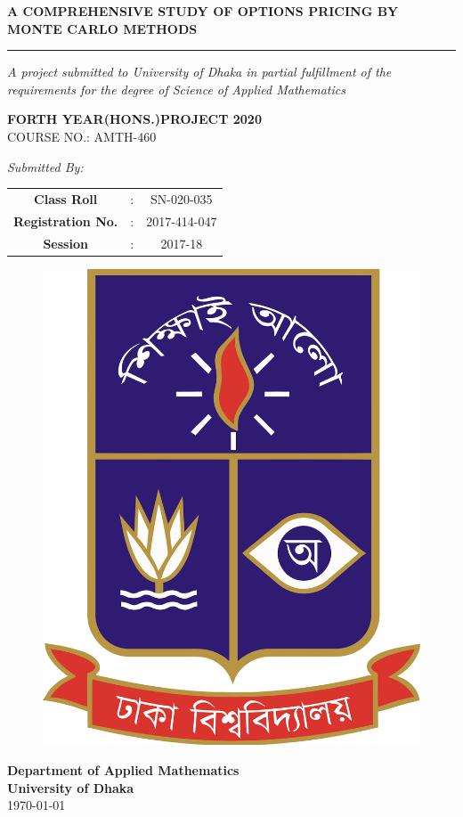 
\thispagestyle{empty}
\begin{center}
	\textcolor{blue!60!black!80}{\Large\bf A COMPREHENSIVE STUDY OF OPTIONS PRICING BY}
	\textcolor{blue!60!black!80}{{\Large\bf MONTE CARLO METHODS\\}}
	\rule{\textwidth}{0.4pt}
	\textcolor{blue!60!black!100}{\it A project submitted to University of Dhaka in partial fulfillment of the requirements for the degree of Science of Applied Mathematics}
	\vspace{.4in}
\end{center}
\begin{center}
	\textcolor{blue!60!black!80}{\bf FORTH YEAR(HONS.)PROJECT 2020}\\
	\vspace{3pt}
	{COURSE NO.: AMTH-460}
\end{center}
\vspace{.3in}
\begin{center}
		\textcolor{blue!60!black!80}{\it Submitted By:}\\[2mm]
	\begin{tabular}{ c c c}
		{\bf Class Roll} & :& \hspace{0.3in}SN-020-035  \\ 
		{\bf Registration No.} &: & \hspace{0.4in}2017-414-047  \\  
		{\bf Session} & :&2017-18     
	\end{tabular}
	
	\vspace{.6in}
\end{center}

\begin{figure}[H]
	\centering
	\includegraphics[width=.25\linewidth]{logo}
\end{figure}


\begin{center}
	{\bf Department of Applied Mathematics\\
	University of Dhaka}\\
    \today
\end{center}